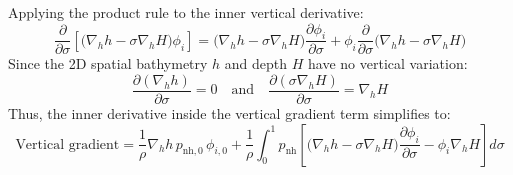 \documentclass{article}
\newcommand{\nablah}{\nabla_h}
\newcommand{\pnh}{p_{\text{nh}}}
\newcommand{\pnhbottom}{p_{\text{nh},0}}
\begin{document}
\begin{itemize}
\begin{itemize}[label=$\diamond$]
        Applying the product rule to the inner vertical derivative:
        $$\frac{\partial}{\partial \sigma} \left[ \Big(\nablah h - \sigma \nablah H\Big) \phi_i \right] = \Big(\nablah h - \sigma \nablah H\Big) \frac{\partial \phi_i}{\partial \sigma} + \phi_i \frac{\partial}{\partial \sigma}\Big(\nablah h - \sigma \nablah H\Big)$$
        Since the 2D spatial bathymetry $h$ and depth $H$ have no vertical variation:
        $$\frac{\partial (\nablah h)}{\partial \sigma} = 0 \quad \text{and} \quad \frac{\partial (\sigma \nablah H)}{\partial \sigma} = \nablah H$$
        Thus, the inner derivative inside the vertical gradient term simplifies to:
        $$\text{Vertical gradient} = \frac{1}{\rho}\nablah h \,\pnhbottom \,\phi_{i,0}+ \frac{1}{\rho} \int_0^1 \pnh \left[ \Big(\nablah h - \sigma \nablah H\Big) \frac{\partial \phi_i}{\partial \sigma} - \phi_i \nablah H \right] d\sigma$$
    \end{itemize}


\end{itemize}
\end{document}
